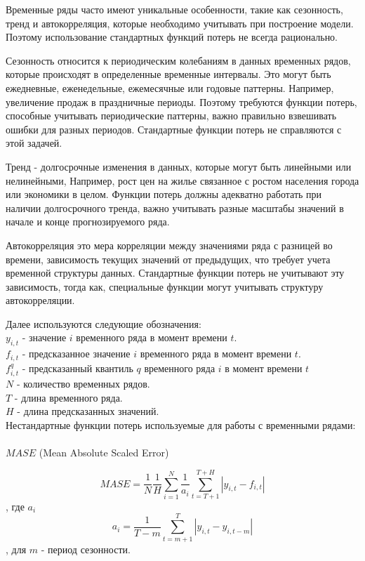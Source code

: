 Временные ряды часто имеют уникальные особенности, такие как сезонность, тренд и автокорреляция, которые необходимо учитывать при построение модели. Поэтому использование стандартных функций потерь не всегда рационально.

Сезонность относится к периодическим колебаниям в данных временных рядов, которые происходят в определенные временные интервалы. Это могут быть ежедневные, еженедельные, ежемесячные или годовые паттерны. Например, увеличение продаж в праздничные периоды.
Поэтому требуются функции потерь, способные учитывать периодические паттерны, важно правильно взвешивать ошибки для разных периодов. Стандартные функции потерь не справляются с этой задачей.

Тренд - долгосрочные изменения в данных, которые могут быть линейными или нелинейными,
Например, рост цен на жилье связанное с ростом населения города или экономики в целом.
Функции потерь должны адекватно работать при наличии долгосрочного тренда, важно учитывать разные масштабы значений в начале и конце прогнозируемого ряда.

Автокорреляция это мера корреляции между значениями ряда с разницей во времени, зависимость текущих значений от предыдущих, что требует учета временной структуры данных.
Стандартные функции потерь не учитывают эту зависимость, тогда как, специальные функции могут учитывать структуру автокорреляции.

Далее используются следующие обозначения:\\
$y_{i,t}$ - значение $i$ временного ряда в момент времени $t$.\\
$f_{i,t}$ - предсказанное значение $i$ временного ряда в момент времени $t$.\\
$f_{i,t}^q$ - предсказанный квантиль $q$ временного ряда $i$ в момент времени $t$\\
$N$ - количество временных рядов.\\
$T$ -  длина временного ряда.\\
$H$ - длина предсказанных значений.\\

Нестандартные функции потерь используемые для работы с временными рядами:\\
\\
$MASE$ (Mean Absolute Scaled Error)

$$MASE = \frac{1}{N} \frac{1}{H} \sum_{i = 1}^{N} \frac{1}{a_{i}}\sum_{t = T + 1} ^ {T + H}|y_{i,t} - f_{i,t}| $$ , где $a_{i}$
$$a_{i} = \frac{1}{T - m} \sum_{t = m + 1}^{T}|y_{i,t} - y_{i, t - m}|$$, для $m$ - период сезонности.

